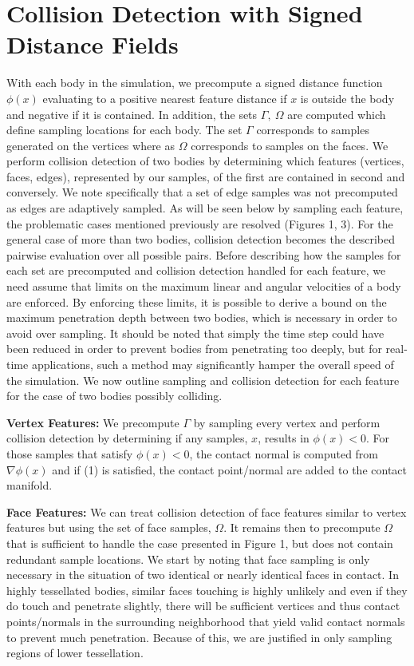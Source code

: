\documentclass[9pt,twocolumn]{article}
\begin{document}
\section{Collision Detection with Signed Distance Fields}

With each body in the simulation, we precompute a signed distance function $\phi(x)$ evaluating to a positive nearest feature distance if $x$ is outside the body and negative if it is contained. In addition, the sets $\Gamma, \ \Omega$ are computed which define sampling locations for each body. The set $\Gamma$ corresponds to samples generated on the vertices where as $\Omega$ corresponds to samples on the faces. We perform collision detection of two bodies by determining which features (vertices, faces, edges), represented by our samples, of the first are contained in second and conversely. We note specifically that a set of edge samples was not precomputed as edges are adaptively sampled. As will be seen below by sampling each feature, the problematic cases mentioned previously are resolved (Figures 1, 3). For the general case of more than two bodies, collision detection becomes the described pairwise evaluation over all possible pairs. Before describing how the samples for each set are precomputed  and collision detection handled for each feature, we need assume that limits on the maximum linear and angular velocities of a body are enforced. By enforcing these limits, it is possible to derive a bound on the maximum penetration depth between two bodies, which is necessary in order to avoid over sampling. It should be noted that simply the time step could have been reduced in order to prevent bodies from penetrating too deeply, but for real-time applications, such a method may significantly hamper the overall speed of the simulation. We now outline sampling and collision detection for each feature for the case of two bodies possibly colliding. \newline

{\bf Vertex Features:} We precompute $\Gamma$ by sampling every vertex and perform collision detection by determining if any samples, $x$,  results in $\phi(x) < 0$. For those samples that satisfy $\phi(x) < 0$, the contact normal is computed from $\nabla \phi(x)$ and if (1) is satisfied, the contact point/normal are added to the contact manifold. \newline

{\bf Face Features:} We can treat collision detection of face features similar to vertex features but using the set of face samples, $\Omega$. It remains then to precompute $\Omega$ that is sufficient to handle the case presented in Figure 1, but does not contain redundant sample locations. We start by noting that face sampling is only necessary in the situation of two identical or nearly identical faces in contact. In highly tessellated bodies, similar faces touching is highly unlikely and even if they do touch and penetrate slightly, there will be sufficient vertices and thus contact points/normals  in the surrounding neighborhood that yield valid contact normals to prevent much penetration. Because of this, we are justified in only sampling regions of lower tessellation. \newline
\end{document}
